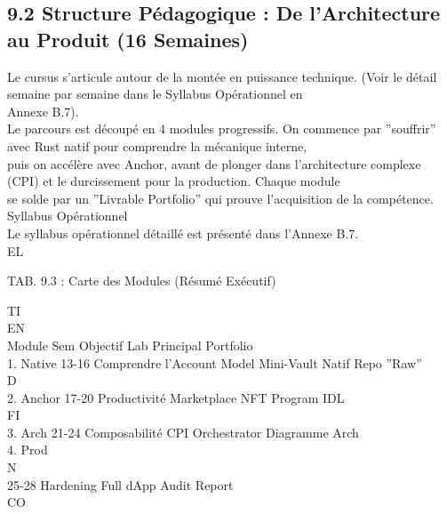 \subsection{9.2 Structure Pédagogique : De l’Architecture au Produit (16 Semaines)}
Le cursus s’articule autour de la montée en puissance technique. (Voir le détail semaine par semaine dans le Syllabus Opérationnel en\\
Annexe B.7).\\
Le parcours est découpé en 4 modules progressifs. On commence par ”souffrir” avec Rust natif pour comprendre la mécanique interne,\\
puis on accélère avec Anchor, avant de plonger dans l’architecture complexe (CPI) et le durcissement pour la production. Chaque module\\
se solde par un ”Livrable Portfolio” qui prouve l’acquisition de la compétence.\\
\vspace{0.5em}
Syllabus Opérationnel\\
\vspace{0.5em}
Le syllabus opérationnel détaillé est présenté dans l’Annexe B.7.\\
\vspace{0.5em}
\vspace{0.5em}
\vspace{0.5em}
\vspace{0.5em}
EL\\
\begin{center}\begin{tabular}TAB. 9.3 : Carte des Modules (Résumé Exécutif)\end{tabular}\end{center}
\vspace{0.5em}
\vspace{0.5em}
\vspace{0.5em}
\vspace{0.5em}
TI\\
EN\\
Module Sem Objectif                        Lab Principal    Portfolio\\
1. Native 13-16 Comprendre l’Account Model Mini-Vault Natif Repo ”Raw”\\
\vspace{0.5em}
\vspace{0.5em}
\vspace{0.5em}
\vspace{0.5em}
D\\
2. Anchor 17-20 Productivité               Marketplace NFT Program IDL\\
\vspace{0.5em}
\vspace{0.5em}
\vspace{0.5em}
\vspace{0.5em}
FI\\
3. Arch   21-24 Composabilité              CPI Orchestrator Diagramme Arch\\
4. Prod\\
N\\
25-28 Hardening                  Full dApp        Audit Report\\
CO\\
\vspace{0.5em}
